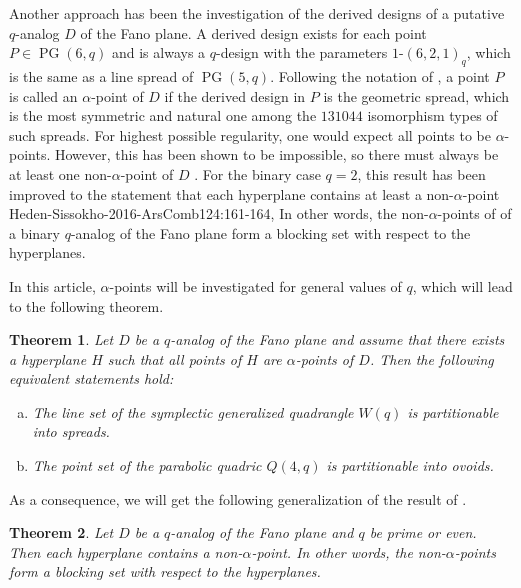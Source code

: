 \documentclass[a4paper,abstracton,12pt]{scrartcl}
\DeclareMathOperator{\PG}{PG}
\newtheorem{theorem}{Theorem}
\theoremstyle{definition}
\theoremstyle{remark}
\begin{document}
Another approach has been the investigation of the derived designs of a putative $q$-analog $D$ of the Fano plane.
A derived design exists for each point $P\in\PG(6,q)$ and is always a $q$-design with the parameters $1$-$(6,2,1)_q$, which is the same as a line spread of $\PG(5,q)$.
Following the notation of \cite{Heden-Sissokho-2016-ArsComb124:161-164}, a point $P$ is called an \emph{$\alpha$}-point of $D$ if the derived design in $P$ is the geometric spread, which is the most symmetric and natural one among the $131044$ isomorphism types \cite{Mateva-Topalova-2009-JCD17[1]:90-102} of such spreads.
For highest possible regularity, one would expect all points to be $\alpha$-points.
However, this has been shown to be impossible, so there must always be at least one non-$\alpha$-point of $D$ \cite{Thomas-1996-GeomDed63[3]:247-253}.
For the binary case $q=2$, this result has been improved to the statement that each hyperplane contains at least a non-$\alpha$-point {Heden-Sissokho-2016-ArsComb124:161-164},
In other words, the non-$\alpha$-points of of a binary $q$-analog of the Fano plane form a blocking set with respect to the hyperplanes.

In this article, $\alpha$-points will be investigated for general values of $q$, which will lead to the following theorem.
\begin{theorem}
	\label{thm:partition}
	Let $D$ be a $q$-analog of the Fano plane and assume that there exists a hyperplane $H$ such that all points of $H$ are $\alpha$-points of $D$.
	Then the following equivalent statements hold:
	\begin{enumerate}[(a)]
		\item\label{thm:partition:w} The line set of the symplectic generalized quadrangle $W(q)$ is partitionable into spreads.
		\item\label{thm:partition:q} The point set of the parabolic quadric $Q(4,q)$ is partitionable into ovoids.
	\end{enumerate}
\end{theorem}

As a consequence, we will get the following generalization of the result of \cite{Heden-Sissokho-2016-ArsComb124:161-164}.

\begin{theorem}
	\label{thm:alpha_points_block}
	Let $D$ be a $q$-analog of the Fano plane and $q$ be prime or even.
	Then each hyperplane contains a non-$\alpha$-point.
	In other words, the non-$\alpha$-points form a blocking set with respect to the hyperplanes.
\end{theorem}
\end{document}
